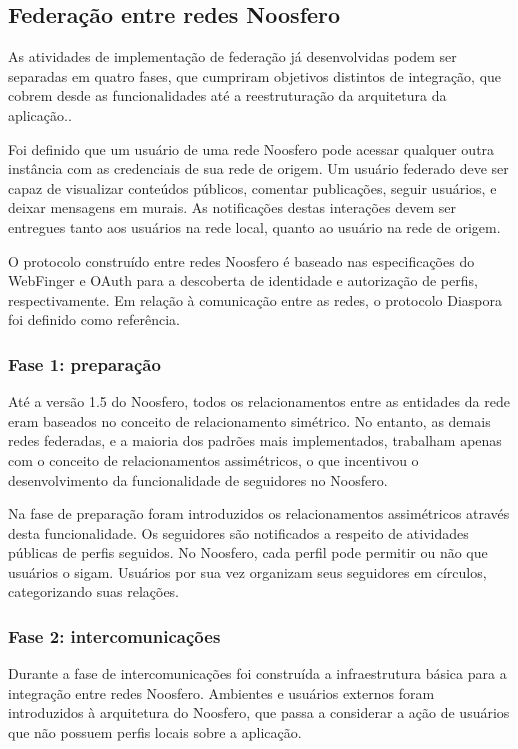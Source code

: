 \subsection{Federação entre redes Noosfero}
\label{subsec:federacao_noosfero}

As atividades de implementação de federação já desenvolvidas podem ser separadas em
quatro fases, que cumpriram objetivos distintos de integração, que cobrem desde as
funcionalidades até a reestruturação da arquitetura da aplicação..

Foi definido que um usuário de uma rede Noosfero pode acessar qualquer outra
instância com as credenciais de sua rede de origem. Um usuário federado deve ser
capaz de visualizar conteúdos públicos, comentar publicações, seguir usuários, e
deixar mensagens em murais. As notificações destas interações devem ser entregues
tanto aos usuários na rede local, quanto ao usuário na rede de origem.

O protocolo construído entre redes Noosfero é baseado nas especificações do
WebFinger e OAuth para a descoberta de identidade e autorização de perfis,
respectivamente. Em relação à comunicação entre as redes, o protocolo Diaspora foi
definido como referência. 

\subsubsection{Fase 1: preparação}

Até a versão 1.5 do Noosfero, todos os relacionamentos entre as entidades da rede
eram baseados no conceito de relacionamento simétrico. No entanto, as demais redes
federadas, e a maioria dos padrões mais implementados, trabalham apenas com o
conceito de relacionamentos assimétricos, o que incentivou o desenvolvimento da
funcionalidade de seguidores no Noosfero.

Na fase de preparação foram introduzidos os relacionamentos assimétricos através
desta funcionalidade. Os seguidores são notificados a respeito de atividades
públicas de perfis seguidos. No Noosfero, cada perfil pode permitir ou não que
usuários o sigam. Usuários por sua vez organizam seus seguidores em círculos,
categorizando suas relações.

\subsubsection{Fase 2: intercomunicações}

Durante a fase de intercomunicações foi construída a infraestrutura básica para a
integração entre redes Noosfero. Ambientes e usuários externos foram introduzidos à
arquitetura do Noosfero, que passa a considerar a ação de usuários que não possuem
perfis locais sobre a aplicação.

